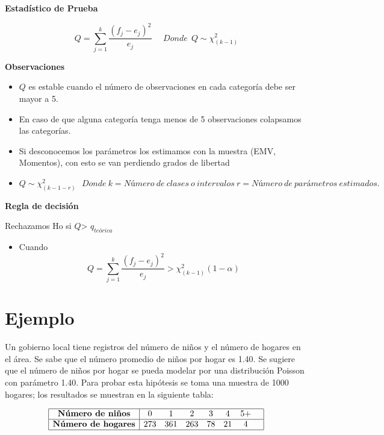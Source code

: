 \documentclass[a4paper,oneside,openany]{book}
\providecommand{\tightlist}{%
  \setlength{\itemsep}{0pt}\setlength{\parskip}{0pt}}
\begin{document}
\textbf{Estadístico de Prueba}

\[Q= \sum_{j=1}^{k}\frac{(f_{j}-e_{j})^2}{e_{j}}  \ \ \ \ \ \ Donde\ \ Q \sim \chi^2_{(k-1)}\]

\textbf{Observaciones}

\begin{itemize}
\item
  \(Q\) es estable cuando el número de observaciones en cada categoría
  debe ser mayor a 5.
\item
  En caso de que alguna categoría tenga menos de 5 observaciones
  colapsamos las categorías.
\item
  Si desconocemos los parámetros los estimamos con la muestra (EMV,
  Momentos), con esto se van perdiendo grados de libertad
\item
  \[Q \sim \chi^2_{(k-1-r)}\ \ \ Donde\ k = Número\ de\ clases\ o\ intervalos\ r=Número\ de\ parámetros\ estimados.\]
\end{itemize}

\textbf{Regla de decisión}

Rechazamos Ho si \(Q\)\textgreater{} \(q_{teórica}\)

\begin{itemize}
\tightlist
\item
  Cuando
  \[Q= \sum_{j=1}^{k}\frac{(f_{j}-e_{j})^2}{e_{j}} > \chi^2_{(k-1)}(1-\alpha)\]
\end{itemize}

\section{Ejemplo}\label{ejemplo-10}

Un gobierno local tiene registros del número de niños y el número de
hogares en el área. Se sabe que el número promedio de niños por hogar es
1.40. Se sugiere que el número de niños por hogar se pueda modelar por
una distribución Poisson con parámetro 1.40. Para probar esta hipótesis
se toma una muestra de 1000 hogares; los resultados se muestran en la
siguiente tabla:

\[
\begin{equation*}
\begin{array}{|c |c c c c c c c|}
\hline
\textbf{Número de niños} &0 &1 &2& 3&4 &5+& \\
\hline
\textbf{Número de hogares} & 273& 361&263 &78 & 21 & 4& \\
\hline
\end{array}
\end{equation*}
\]
\end{document}
